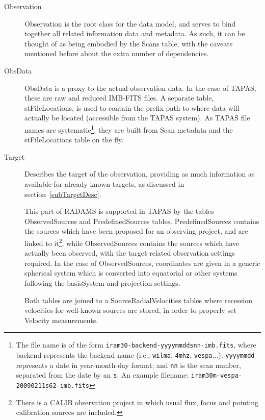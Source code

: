 			\begin{description}
				\item[Observation] Observation is the root class for
				the data model, and serves to bind together all
				related information data and metadata. As such,
				it can be thought of as being embodied by the
				Scans table, with the caveats mentioned before
				about the extra number of dependencies.

				\item[ObsData] ObsData is a proxy to the actual
				observation data. In the case of TAPAS, these are
				raw and reduced IMB-FITS files. A separate table,
				stFileLocations, is used to contain the prefix
				path to where data will actually be located
				(accessible from the TAPAS system). As TAPAS file
				names are systematic\footnote{The file name is of
				the form
				\texttt{iram30-backend-yyyymmddsnn-imb.fits}, where
				backend represents the backend name (i.e.,
				\texttt{wilma}, \texttt{4mhz}, \texttt{vespa}...);
				\texttt{yyyymmdd} represents a date in
				year-month-day format; and \texttt{nn} is the scan
				number, separated from the date by an \texttt{s}.
				An example filename:
				\texttt{iram30m-vespa-20090211s62-imb.fits}}, they
				are built from Scan metadata and the
				stFileLocations table on the fly.

				\item[Target] Describes the target of the observation,
				providing as much information as available for
				already known targets, as discussed in
				section~\ref{subTargetDesc}.
				
				This part of RADAMS is supported in TAPAS by the
				tables ObservedSources and PredefinedSources
				tables.  PredefinedSources contains the sources
				which have been proposed for an observing project,
				and are linked to it\footnote{There is a CALIB 
				observation project in which usual flux, focus
				and pointing calibration sources are included.},
				while ObservedSources
				contains the sources which have actually been
				observed, with the target-related observation
				settings required. In the case of ObservedSources,
				coordinates are given in a generic spherical system
				which is converted into equatorial or other
				systems following the basisSystem and projection
				settings.
				
				Both tables are joined to a SourceRadialVelocities
				tables where recession velocities for well-known
				sources are stored, in order to properly set
				Velocity measurements.


\end{description}
